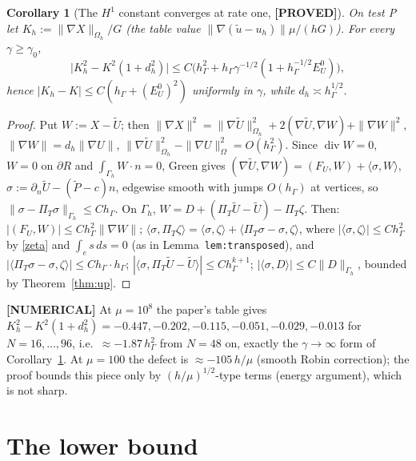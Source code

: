\documentclass[11pt]{article}
\newtheorem{corollary}[theorem]{Corollary}
\theoremstyle{remark}
\newcommand{\hG}{h_\Gamma}
\newcommand{\Gh}{\Gamma_h}
\newcommand{\Oh}{\Omega_h}
\newcommand{\PT}{\Pi_T}
\newcommand{\norm}[1]{\|#1\|}
\newcommand{\ip}[2]{\langle #1,#2\rangle}
\newcommand{\dn}{\partial_n}
\newcommand{\Ut}{\tilde U}
\newcommand{\Pt}{\tilde P}
\newcommand{\EU}{E^{0}_{U}}
\newcommand{\ut}{\tilde u}
\renewcommand{\div}{\operatorname{div}}
\newcommand{\lab}[1]{\textbf{[#1]}}
\begin{document}
\begin{corollary}[The $H^1$ constant converges at rate one, \lab{PROVED}]\label{cor:K}
On test P let $K_h:=\norm{\nabla X}_{\Oh}/G$ (the table value $\norm{\nabla(\ut-u_h)}\mu/(hG)$). For every $\gamma\ge\gamma_0$,
\[
\bigl|K_h^2-K^2(1+d_h^2)\bigr|\le C\bigl(\hG^2+\hG\gamma^{-1/2}(1+\hG^{-1/2}\EU)\bigr),
\]
hence $|K_h-K|\le C(\hG+(\EU)^2)$ uniformly in $\gamma$, while $d_h\asymp\hG^{1/2}$.
\end{corollary}
\begin{proof}
Put $W:=X-\Ut$; then $\norm{\nabla X}^2=\norm{\nabla\Ut}^2_{\Oh}+2(\nabla\Ut,\nabla W)+\norm{\nabla W}^2$, $\norm{\nabla W}=d_h\norm{\nabla U}$, $\norm{\nabla\Ut}^2_{\Oh}-\norm{\nabla U}_\Omega^2=O(\hG^2)$. Since $\div W=0$, $W=0$ on $\partial R$ and $\int_{\Gh}W\cdot n=0$, Green gives $(\nabla\Ut,\nabla W)=(F_U,W)+\ip{\sigma}{W}$, $\sigma:=\dn\Ut-(\Pt-c)n$, edgewise smooth with jumps $O(\hG)$ at vertices, so $\norm{\sigma-\PT\sigma}_{\Gh}\le C\hG$. On $\Gh$, $W=D+(\PT\Ut-\Ut)-\PT\zeta$. Then:
$|(F_U,W)|\le C\hG^2\norm{\nabla W}$;
$\ip\sigma{\PT\zeta}=\ip{\sigma}{\zeta}+\ip{\PT\sigma-\sigma}{\zeta}$, where $|\ip\sigma\zeta|\le C\hG^2$ by \eqref{zeta} and $\int_e s\,ds=0$ (as in Lemma~\texttt{lem:transposed}), and $|\ip{\PT\sigma-\sigma}\zeta|\le C\hG\cdot\hG$;
$|\ip{\sigma}{\PT\Ut-\Ut}|\le C\hG^{k+1}$; $|\ip\sigma D|\le C\norm D_{\Gh}$, bounded by Theorem~\ref{thm:up}.
\end{proof}
\noindent\lab{NUMERICAL} At $\mu=10^8$ the paper's table gives $K_h^2-K^2(1+d_h^2)=-0.447,-0.202,-0.115,-0.051,-0.029,-0.013$ for $N=16,\dots,96$, i.e.\ $\approx-1.87\,\hG^2$ from $N=48$ on, exactly the $\gamma\to\infty$ form of Corollary~\ref{cor:K}. At $\mu=100$ the defect is $\approx-105\,h/\mu$ (smooth Robin correction); the proof bounds this piece only by $(h/\mu)^{1/2}$-type terms (energy argument), which is not sharp.

\section{The lower bound}
\end{document}
